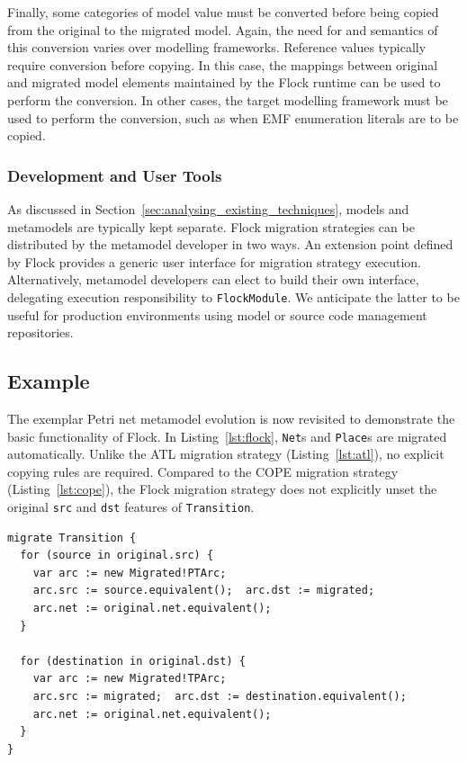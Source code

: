 Finally, some categories of model value must be converted before being copied from the original to the migrated model. Again, the need for and semantics of this conversion varies over modelling frameworks. Reference values typically require conversion before copying. In this case, the mappings between original and migrated model elements maintained by the Flock runtime can be used to perform the conversion. In other cases, the target modelling framework must be used to perform the conversion, such as when EMF enumeration literals are to be copied.


\subsubsection{Development and User Tools}
As discussed in Section~\ref{sec:analysing_existing_techniques}, models and metamodels are typically kept separate. Flock migration strategies can be distributed by the metamodel developer in two ways. An extension point defined by Flock provides a generic user interface for migration strategy execution. Alternatively, metamodel developers can elect to build their own interface, delegating execution responsibility to \texttt{FlockModule}. We anticipate the latter to be useful for production environments using model or source code management repositories.


\subsection{Example}
The exemplar Petri net metamodel evolution is now revisited to demonstrate the basic functionality of Flock. In Listing~\ref{lst:flock}, \texttt{Net}s and \texttt{Place}s are migrated automatically. Unlike the ATL migration strategy (Listing~\ref{lst:atl}), no explicit copying rules are required. Compared to the COPE migration strategy (Listing~\ref{lst:cope}), the Flock migration strategy does not explicitly unset the original \texttt{src} and \texttt{dst} features of \texttt{Transition}.

\begin{lstlisting}[caption=Petri nets model migration in Flock, label=lst:flock, language=Flock]
migrate Transition {
  for (source in original.src) {
    var arc := new Migrated!PTArc;
    arc.src := source.equivalent();  arc.dst := migrated;
    arc.net := original.net.equivalent();
  }

  for (destination in original.dst) {
    var arc := new Migrated!TPArc;
    arc.src := migrated;  arc.dst := destination.equivalent();
    arc.net := original.net.equivalent();
  }
}
\end{lstlisting}

